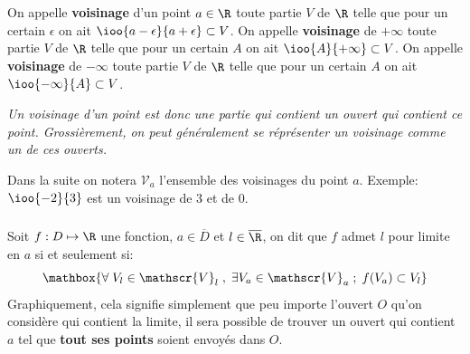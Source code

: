 \chapter*{}
On appelle \textbf{voisinage} d'un point \(a \in \R\) toute partie \(V\) de \(\R\) telle que pour un certain \(\epsilon\) on ait \(\ioo{a - \epsilon}{a + \epsilon} \subset V\).\+
On appelle \textbf{voisinage} de \(+\infty\) toute partie \(V\) de \(\R\) telle que pour un certain \(A\) on ait \(\ioo{A}{+\infty} \subset V\).\+
On appelle \textbf{voisinage} de \(-\infty\) toute partie \(V\) de \(\R\) telle que pour un certain \(A\) on ait \(\ioo{-\infty}{A} \subset V\).\+
\begin{center}
   \textit{
      Un voisinage d'un point est donc une partie qui contient un ouvert qui contient ce point. Grossièrement, on peut généralement se réprésenter un voisinage comme un de ces ouverts.
   }
\end{center}
Dans la suite on notera \(\mathscr{V}_a\) l'ensemble des voisinages du point \(a\).\+
Exemple: \(\ioo{-2}{3}\) est un voisinage de \(3\) et de \(0\).
\subsection*{}
Soit \(f : D \mapsto \R\) une fonction, \(a \in \overline{D}\) et \(l \in \overline{\R}\), on dit que \(f\) admet \(l\) pour limite en \(a\) si et seulement si:
\[
   \mathbox{\forall \; V_l \in \mathscr{V}_l \; , \; \exists  V_a \in \mathscr{V}_a \; ; \; f(V_a) \subset V_l }   
\]
Graphiquement, cela signifie simplement que peu importe l'ouvert \(O\) qu'on considère qui contient la limite, il sera possible de trouver un ouvert qui contient \(a\) tel que \textbf{tout ses points} soient envoyés dans \(O\).

